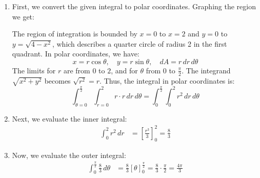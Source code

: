 \documentclass[reqno, 12pt]{amsart}
\begin{document}
\begin{itemize}
    \begin{answerbox}
      \begin{enumerate}
        \item First, we convert the given integral to polar coordinates. Graphing the region we get:
          \begin{center}
          \end{center}
          The region of integration is bounded by $x=0$ to $x=2$ and $y=0$ to $y=\sqrt{4-x^2}$, which describes a quarter circle of radius 2 in the first quadrant. In polar coordinates, we have:
          \[x = r\cos\theta, \quad y = r\sin\theta, \quad dA = r \, dr \, d\theta\]
          The limits for $r$ are from $0$ to $2$, and for $\theta$ from $0$ to $\frac{\pi}{2}$. The integrand $\sqrt{x^2 + y^2}$ becomes $\sqrt{r^2} = r$. Thus, the integral in polar coordinates is:
          \[\int_{\theta=0}^{\frac{\pi}{2}} \int_{r=0}^{2} r \cdot r \, dr \, d\theta = \int_{0}^{\frac{\pi}{2}} \int_{0}^{2} r^2 \, dr \, d\theta\]
        \item Next, we evaluate the inner integral:
          \begin{align*}
            \int_{0}^{2} r^2 \, dr &= \left[ \frac{r^3}{3} \right]_{0}^{2} = \frac{8}{3}
          \end{align*}
        \item Now, we evaluate the outer integral:
          \begin{align*}
            \int_{0}^{\frac{\pi}{2}} \frac{8}{3} \, d\theta &= \frac{8}{3} \left[ \theta \right]_{0}^{\frac{\pi}{2}} = \frac{8}{3} \cdot \frac{\pi}{2} = \frac{4\pi}{3}

\end{align*}
\end{enumerate}
\end{answerbox}
\end{itemize}
\end{document}
